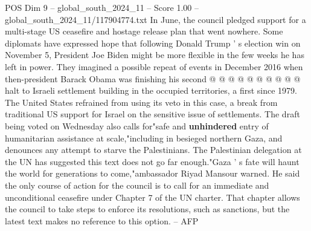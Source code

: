 \begin{textsample}{POS Dim 9 – global\_south\_2024\_11 – Score 1.00 – global\_south\_2024\_11/117904774.txt}
In June, the council pledged support for a multi-stage US ceasefire and hostage release plan that went nowhere.
Some diplomats have expressed hope that following Donald Trump ' s election win on November 5, President Joe Biden might be more flexible in the few weeks he has left in power.
They imagined a possible repeat of events in December 2016 when then-president Barack Obama was finishing his second @ @ @ @ @ @ @ @ @ @ halt to Israeli settlement building in the occupied territories, a first since 1979.
The United States refrained from using its veto in this case, a break from traditional US support for Israel on the sensitive issue of settlements.
The draft being voted on Wednesday also calls for"safe and \textbf{unhindered} entry of humanitarian assistance at scale,"including in besieged northern Gaza, and denounces any attempt to starve the Palestinians.
The Palestinian delegation at the UN has suggested this text does not go far enough."Gaza ' s fate will haunt the world for generations to come,"ambassador Riyad Mansour warned.
He said the only course of action for the council is to call for an immediate and unconditional ceasefire under Chapter 7 of the UN charter.
That chapter allows the council to take steps to enforce its resolutions, such as sanctions, but the latest text makes no reference to this option. -- AFP

\end{textsample}

